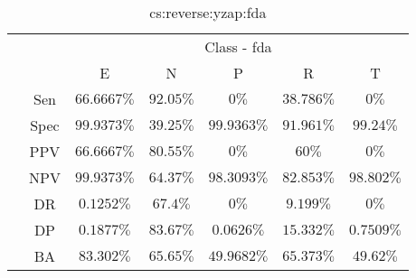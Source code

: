 \begin{table}[!ht]
	\centering
	\begin{tabular}{|c|c|c|c|c|c|c|}
		\cline{3-7}
		\multicolumn{2}{c|}{} & \multicolumn{5}{c|}{Class - fda} \\ \cline{3-7}
		\multicolumn{2}{c|}{} & E & N & P & R & T \\ \hline
		\multirow{7}{*}{\rotatebox{90}{Statistics}} & Sen & $66.6667\%$ & $92.05\%$ & $0\%$ & $38.786\%$ & $0\%$ \\ \cline{2-7}
		 & Spec & $99.9373\%$ & $39.25\%$ & $99.9363\%$ & $91.961\%$ & $99.24\%$ \\ \cline{2-7}
		 & PPV & $66.6667\%$ & $80.55\%$ & $0\%$ & $60\%$ & $0\%$ \\ \cline{2-7}
		 & NPV & $99.9373\%$ & $64.37\%$ & $98.3093\%$ & $82.853\%$ & $98.802\%$ \\ \cline{2-7}
		 & DR & $0.1252\%$ & $67.4\%$ & $0\%$ & $9.199\%$ & $0\%$ \\ \cline{2-7}
		 & DP & $0.1877\%$ & $83.67\%$ & $0.0626\%$ & $15.332\%$ & $0.7509\%$ \\ \cline{2-7}
		 & BA & $83.302\%$ & $65.65\%$ & $49.9682\%$ & $65.373\%$ & $49.62\%$ \\ \hline
	\end{tabular}
	\caption{cs:reverse:yzap:fda}
	\label{tab:cs:reverse:yzap:fda}
\end{table}
